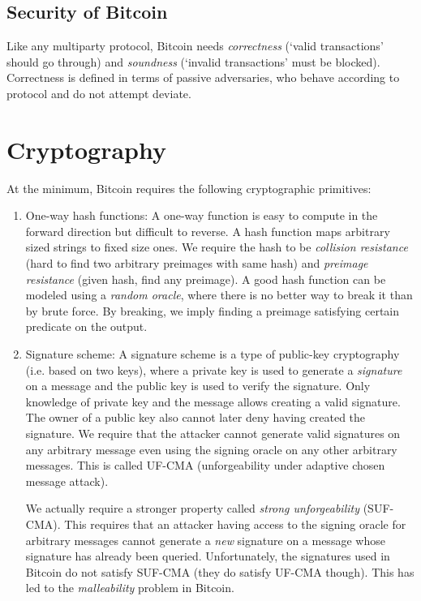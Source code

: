 \documentclass[]{report}   %
\begin{document}
\subsection{Security of Bitcoin}

Like any multiparty protocol, Bitcoin needs {\em correctness} (`valid transactions' should go through) and {\em soundness} (`invalid transactions' must be blocked). Correctness is defined in terms of passive adversaries, who behave according to protocol and do not attempt deviate. 

\section{Cryptography}

At the minimum, Bitcoin requires the following cryptographic primitives:
\begin{enumerate}
	\item One-way hash functions: A one-way function is easy to compute in the forward direction but difficult to reverse. A hash function maps arbitrary sized strings to fixed size ones. We require the hash to be {\em collision resistance} (hard to find two arbitrary preimages with same hash) and {\em preimage resistance} (given hash, find any preimage). A good hash function can be modeled using a {\em random oracle}, where there is no better way to break it than by brute force. By breaking, we imply finding a preimage satisfying certain predicate on the output. 
	\item Signature scheme: A signature scheme is a type of public-key cryptography (i.e. based on two keys), where a private key is used to generate a {\em signature} on a message and the public key is used to verify the signature. Only knowledge of private key and the message allows creating a valid signature. The owner of a public key also cannot later deny having created the signature. 
	We require that the attacker cannot generate valid signatures on any arbitrary message even using the signing oracle on any other arbitrary messages. This is called UF-CMA (unforgeability under adaptive chosen message attack).
	
	We actually require a stronger property called {\em strong unforgeability} (SUF-CMA). This requires that an attacker having access to the signing oracle for arbitrary messages cannot generate a {\em new} signature on a message whose signature has already been queried. Unfortunately, the signatures used in Bitcoin do not satisfy SUF-CMA (they do satisfy UF-CMA though). This has led to the {\em malleability} problem in Bitcoin.
	
\end{enumerate}
\end{document}

